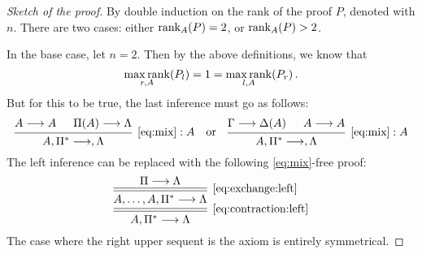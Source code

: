 \documentclass[11pt,a4paper]{article}
\begin{document}
\begin{proof}[Sketch of the proof]
    By double induction on the rank of the proof \(P\),
    denoted with \(n\). There are two cases:
    either \(\operatorname*{rank}_A(P) = 2\), or \(\operatorname*{rank}_A(P) > 2\).

    In the base case, let \(n=2\). Then by the above definitions,
    we know that
    \begin{equation*}
    \operatorname*{max\,rank}_{r,A}(P_l) = 1 = \operatorname*{max\,rank}_{l,A}(P_r)\,.
    \end{equation*}
    But for this to be true, the last inference must go as follows:
    \begin{equation*}
        \begin{prooftree}
            \hypo{A\seq A}
            \hypo{\Pi(A)\seq\Lambda}
            \infer2[\(\eqref{eq:mix}:A\)]{A,\Pi^*\seq,\Lambda}
        \end{prooftree}
        \quad\text{or}\quad
        \begin{prooftree}
            \hypo{\Gamma\seq\Delta(A)}
            \hypo{A\seq A}
            \infer2[\(\eqref{eq:mix}:A\)]{A,\Pi^*\seq,\Lambda}\,.
        \end{prooftree}
    \end{equation*}
    The left inference can be replaced with the following \eqref{eq:mix}-free proof:
    \begin{equation*}
        \begin{prooftree}
            \hypo{\Pi\seq\Lambda}
            \infer[double]1[\eqref{eq:exchange:left}]{A,\ldots,A,\Pi^*\seq\Lambda}
            \infer[double]1[\eqref{eq:contraction:left}]{A,\Pi^*\seq\Lambda}
        \end{prooftree}
    \end{equation*}
    The case where the right upper sequent is the axiom
    is entirely symmetrical.


\end{proof}
\end{document}
